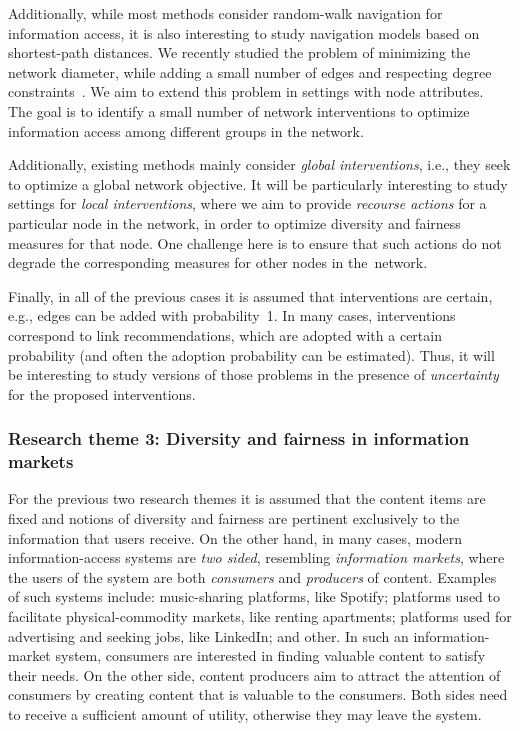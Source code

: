 \documentclass[a4paper,11pt]{article}
\begin{document}
Additionally, while most methods consider random-walk navigation for information access, 
it is also interesting to study navigation models based on shortest-path distances. 
We recently studied the problem of minimizing the network diameter, 
while adding a small number of edges and respecting degree constraints~\cite{adriaens2022diameter}.
We aim to extend this problem in settings with node attributes. 
The goal is to identify a small number of network interventions
to optimize information access among different groups in the network.

Additionally, existing methods mainly consider \emph{global interventions}, 
i.e., they seek to optimize a global network objective. 
It will be particularly interesting to study settings for \emph{local interventions}, 
where we aim to provide \emph{recourse actions} for a particular node in the network, 
in order to optimize diversity and fairness measures for that node. 
One challenge here is to ensure that such actions do not degrade 
the corresponding measures for other nodes in the~network. 

Finally, in all of the previous cases it is assumed that interventions are certain, 
e.g., edges can be added with probability~1.
In many cases, interventions correspond to link recommendations, 
which are adopted with a certain probability
(and often the adoption probability can be estimated).
Thus, it will be interesting to study versions of those problems
in the presence of \emph{uncertainty} for the proposed interventions.


\vspace{-1mm}
\subsubsection*{Research theme 3: Diversity and fairness in information markets}
\vspace{-1mm}

For the previous two research themes it is assumed that the content items are fixed
and notions of diversity and fairness are pertinent exclusively to the information that users receive. 
On the other hand, in many cases, modern information-access systems are \emph{two sided},
resembling \emph{information markets}, 
where the users of the system are both \emph{consumers} and \emph{producers} of content.
Examples of such systems include:
music-sharing platforms, like Spotify;
platforms used to facilitate physical-commodity markets, like renting apartments; 
platforms used for advertising and seeking jobs, like LinkedIn; and other.
%
In such an information-market system, 
consumers are interested in finding valuable content to satisfy their needs.
On the other side, content producers aim to attract the attention of consumers 
by creating content that is valuable to the consumers.
Both sides need to receive a sufficient amount of utility, 
otherwise they may leave the system. 
\end{document}

